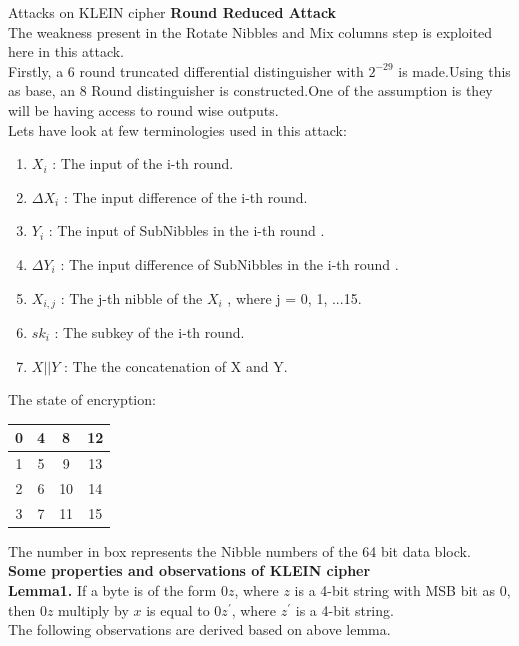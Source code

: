 \begin{frame}{Attacks on KLEIN cipher}
\textbf{Round Reduced Attack}\\
The weakness present in the Rotate Nibbles and Mix columns step is exploited here in this attack.\\
Firstly, a 6 round truncated differential distinguisher with $2^{-29}$ is made.Using this as base, an 8 Round distinguisher is constructed.One of the assumption is they will be having access to round wise outputs.\\
Lets have look at few terminologies used in this attack:\\
\begin{enumerate}
    \item $X_{i}$ : The input of the i-th round.
    \item $\Delta X_{i}$ : The input difference of the i-th round.
    \item $Y_{i}$ : The input of SubNibbles in the i-th round .
    \item $\Delta Y_{i}$ : The input difference of SubNibbles in the i-th round .
    \item $X_{i,j}$ : The j-th nibble of the $X_{i}$ , where j = 0, 1, ...15.
    \item $sk_{i}$ : The subkey of the i-th round.
    \item $X || Y$ : The the concatenation of X and Y.
\end{enumerate}
\end{frame}

\begin{frame}
The state of encryption: \\
\begin{center}
\begin{tabular}{|c|c|c|c|}
\hline
0&4&8&12\\
\hline
1&5&9&13\\
\hline
2&6&10&14 \\
\hline
3&7&11&15\\  
\hline
\end{tabular}
\end{center}
The number in box represents the Nibble numbers of the 64 bit data block.
\textbf{Some properties and observations of KLEIN cipher}\\
\textbf{Lemma1.} If a byte is of the form $0z$, where $z$ is a 4-bit string
with MSB bit as 0, then $0z$ multiply by $x$ is equal to $0z^{'}$, where $z ^{'}$
is a 4-bit string.\\
The following observations are derived based on above lemma.\\ \\

\end{frame}

